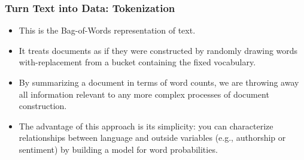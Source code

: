 \documentclass[
  shownotes,
  xcolor={svgnames},
  hyperref={colorlinks,citecolor=DarkBlue,linkcolor=DarkRed,urlcolor=DarkBlue}
  , aspectratio=169]{beamer}
\newcommand{\nv}{\color{Navy}}
\begin{document}
\begin{frame}[fragile]
\frametitle{Turn Text into Data: Tokenization}
\begin{itemize}
\item This is the {\nv Bag-of-Words} representation of text.
\medskip
\item It treats documents as if they were constructed by randomly drawing words with-replacement from a bucket containing the fixed vocabulary. 
\medskip
\item By summarizing a document in terms of word counts, we are throwing away all information relevant to any more complex processes of document construction. 
\medskip
\item The advantage of this approach is its simplicity: you can characterize relationships between language and outside variables (e.g., authorship or sentiment) by building a model for word probabilities.

\end{itemize}
\end{frame}
\end{document}
